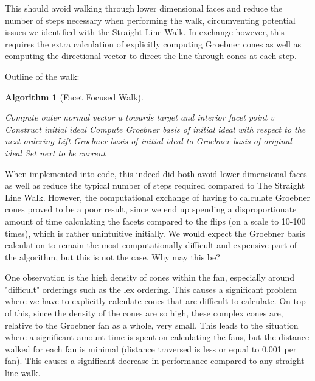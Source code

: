 \documentclass[12pt,a4paper]{report}
\newtheorem{algorithm}[theorem]{Algorithm}
\begin{document}
This should avoid walking through lower dimensional faces and reduce the number of steps necessary when performing the walk, circumventing potential issues we identified with the Straight Line Walk. In exchange however, this requires the extra calculation of explicitly computing Groebner cones as well as computing the directional vector to direct the line through cones at each step.

Outline of the walk:

\begin{algorithm}[Facet Focused Walk]\
 \begin{algorithmic}[1]
    \ENSURE{Reduced Groebner basis for I over $\prec_{2}$.}
    \STATE Compute outer normal vector u towards target and interior facet point v
    \STATE Construct initial ideal
    \STATE Compute Groebner basis of initial ideal with respect to the next ordering
    \STATE Lift Groebner basis of initial ideal to Groebner basis of original ideal
    \STATE Set next to be current
\end{algorithmic}
\end{algorithm}

When implemented into code, this indeed did both avoid lower dimensional faces as well as reduce the typical number of steps required compared to The Straight Line Walk. However, the computational exchange of having to calculate Groebner cones proved to be a poor result, since we end up spending a disproportionate amount of time calculating the facets compared to the flips (on a scale to 10-100 times), which is rather unintuitive initially. We would expect the Groebner basis calculation to remain the most computationally difficult and expensive part of the algorithm, but this is not the case. Why may this be?

One observation is the high density of cones within the fan, especially around "difficult" orderings such as the lex ordering. This causes a significant problem where we have to explicitly calculate cones that are difficult to calculate. On top of this, since the density of the cones are so high, these complex cones are, relative to the Groebner fan as a whole, very small. This leads to the situation where a significant amount time is spent on calculating the fans, but the distance walked for each fan is minimal (distance traversed is less or equal to 0.001 per fan). This causes a significant decrease in performance compared to any straight line walk.
\end{document}
